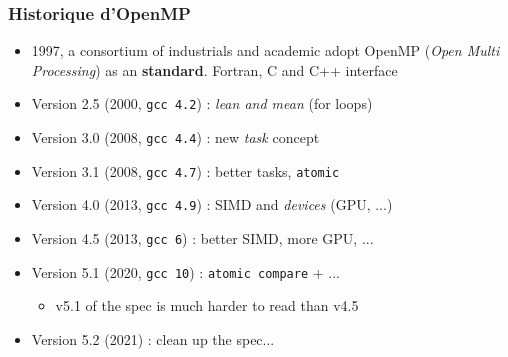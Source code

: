 \documentclass{beamer}
\begin{document}
\begin{frame}
  \frametitle{Historique d'OpenMP}
  \begin{itemize}
  \item 1997, a consortium of industrials and academic adopt OpenMP ({\it Open
      Multi Processing}) as an \textbf{standard}. Fortran, C and C++
    interface

  \item Version 2.5 (2000, \texttt{gcc 4.2}) : \emph{lean and mean} (for loops)

  \item Version 3.0 (2008, \texttt{gcc 4.4}) : new \emph{task} concept 

  \item Version 3.1 (2008, \texttt{gcc 4.7}) : better tasks, \texttt{atomic}

  \item Version 4.0 (2013, \texttt{gcc 4.9}) : SIMD and \emph{devices} (GPU, ...)
    
  \item Version 4.5 (2013, \texttt{gcc 6}) : better SIMD, more GPU, ...
    
  \item Version 5.1 (2020, \texttt{gcc 10}) : \texttt{atomic compare} + ...
    \begin{itemize}
    \item v5.1 of the spec is much harder to read than v4.5
    \end{itemize}
  \item Version 5.2 (2021) : clean up the spec... 
\end{itemize}
\end{frame}
\end{document}
